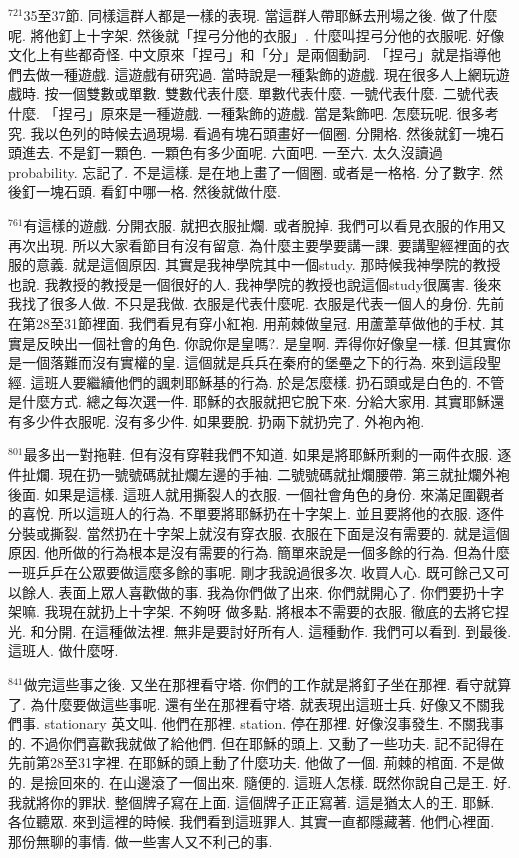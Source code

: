 \documentclass{book}
\begin{document}
$^{721}$35至37節.
同樣這群人都是一樣的表現.
當這群人帶耶穌去刑場之後.
做了什麼呢.
將他釘上十字架.
然後就「捏弓分他的衣服」.
什麼叫捏弓分他的衣服呢.
好像文化上有些都奇怪.
中文原來「捏弓」和「分」是兩個動詞.
「捏弓」就是指導他們去做一種遊戲.
這遊戲有研究過.
當時說是一種紮飾的遊戲.
現在很多人上網玩遊戲時.
按一個雙數或單數.
雙數代表什麼.
單數代表什麼.
一號代表什麼.
二號代表什麼.
「捏弓」原來是一種遊戲.
一種紮飾的遊戲.
當是紮飾吧.
怎麼玩呢.
很多考究.
我以色列的時候去過現場.
看過有塊石頭畫好一個圈.
分開格.
然後就釘一塊石頭進去.
不是釘一顆色.
一顆色有多少面呢.
六面吧.
一至六.
太久沒讀過probability.
忘記了.
不是這樣.
是在地上畫了一個圈.
或者是一格格.
分了數字.
然後釘一塊石頭.
看釘中哪一格.
然後就做什麼.

$^{761}$有這樣的遊戲.
分開衣服.
就把衣服扯爛.
或者脫掉.
我們可以看見衣服的作用又再次出現.
所以大家看節目有沒有留意.
為什麼主要學要講一課.
要講聖經裡面的衣服的意義.
就是這個原因.
其實是我神學院其中一個study.
那時候我神學院的教授也說.
我教授的教授是一個很好的人.
我神學院的教授也說這個study很厲害.
後來我找了很多人做.
不只是我做.
衣服是代表什麼呢.
衣服是代表一個人的身份.
先前在第28至31節裡面.
我們看見有穿小紅袍.
用荊棘做皇冠.
用蘆葦草做他的手杖.
其實是反映出一個社會的角色.
你說你是皇嗎?.
是皇啊.
弄得你好像皇一樣.
但其實你是一個落難而沒有實權的皇.
這個就是兵兵在秦府的堡壘之下的行為.
來到這段聖經.
這班人要繼續他們的諷刺耶穌基的行為.
於是怎麼樣.
扔石頭或是白色的.
不管是什麼方式.
總之每次選一件.
耶穌的衣服就把它脫下來.
分給大家用.
其實耶穌還有多少件衣服呢.
沒有多少件.
如果要脫.
扔兩下就扔完了.
外袍內袍.

$^{801}$最多出一對拖鞋.
但有沒有穿鞋我們不知道.
如果是將耶穌所剩的一兩件衣服.
逐件扯爛.
現在扔一號號碼就扯爛左邊的手袖.
二號號碼就扯爛腰帶.
第三就扯爛外袍後面.
如果是這樣.
這班人就用撕裂人的衣服.
一個社會角色的身份.
來滿足圍觀者的喜悅.
所以這班人的行為.
不單要將耶穌扔在十字架上.
並且要將他的衣服.
逐件分裝或撕裂.
當然扔在十字架上就沒有穿衣服.
衣服在下面是沒有需要的.
就是這個原因.
他所做的行為根本是沒有需要的行為.
簡單來說是一個多餘的行為.
但為什麼一班乒乒在公眾要做這麼多餘的事呢.
剛才我說過很多次.
收買人心.
既可餘己又可以餘人.
表面上眾人喜歡做的事.
我為你們做了出來.
你們就開心了.
你們要扔十字架嘛.
我現在就扔上十字架.
不夠呀 做多點.
將根本不需要的衣服.
徹底的去將它捏光.
和分開.
在這種做法裡.
無非是要討好所有人.
這種動作.
我們可以看到.
到最後.
這班人.
做什麼呀.

$^{841}$做完這些事之後.
又坐在那裡看守塔.
你們的工作就是將釘子坐在那裡.
看守就算了.
為什麼要做這些事呢.
還有坐在那裡看守塔.
就表現出這班士兵.
好像又不關我們事.
stationary 英文叫.
他們在那裡.
station.
停在那裡.
好像沒事發生.
不關我事的.
不過你們喜歡我就做了給他們.
但在耶穌的頭上.
又動了一些功夫.
記不記得在先前第28至31字裡.
在耶穌的頭上動了什麼功夫.
他做了一個.
荊棘的棺面.
不是做的.
是撿回來的.
在山邊滾了一個出來.
隨便的.
這班人怎樣.
既然你說自己是王.
好.
我就將你的罪狀.
整個牌子寫在上面.
這個牌子正正寫著.
這是猶太人的王.
耶穌.
各位聽眾.
來到這裡的時候.
我們看到這班罪人.
其實一直都隱藏著.
他們心裡面.
那份無聊的事情.
做一些害人又不利己的事.
\end{document}
